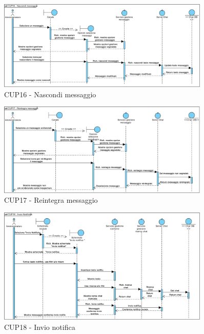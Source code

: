 \begin{figure}
	\centering
	\includegraphics[width=0.9\textwidth]{imgs/gruppo6/sequence/CUP16_nascondi_messaggio.pdf}
	\caption{CUP16 - Nascondi messaggio}
	\label{fig:seq-cup16}
\end{figure}

\begin{figure}
	\centering
	\includegraphics[width=0.9\textwidth]{imgs/gruppo6/sequence/seq_cup17_reintegra_messaggio.pdf}
	\caption{CUP17 - Reintegra messaggio}
	\label{fig:seq-cup17}
\end{figure}

\begin{figure}
	\centering
	\includegraphics[width=0.9\textwidth]{imgs/gruppo6/sequence/CUP18_invio_notifica.pdf}
	\caption{CUP18 - Invio notifica}
	\label{fig:seq-cup18}
\end{figure}


